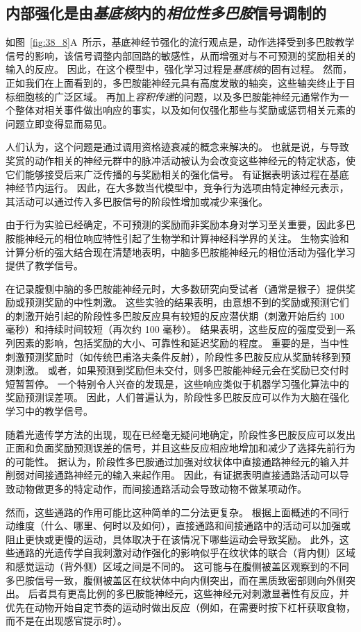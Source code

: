 \subsection{内部强化是由\textit{基底核}内的\textit{相位性多巴胺}信号调制的}

如图~\ref{fig:38_8}A~所示，基底神经节强化的流行观点是，动作选择受到多巴胺教学信号的影响，该信号调整内部回路的敏感性，从而增强对与不可预测的奖励相关的输入的反应。
因此，在这个模型中，强化学习过程是\textit{基底核}的固有过程。
然而，正如我们在上面看到的，多巴胺能神经元具有高度发散的轴突，这些轴突终止于目标细胞核的广泛区域。
再加上\textit{容积传递}的问题，以及多巴胺能神经元通常作为一个整体对相关事件做出响应的事实，以及如何仅强化那些与奖励或惩罚相关元素的问题立即变得显而易见。


人们认为，这个问题是通过调用资格迹衰减的概念来解决的。
也就是说，与导致奖赏的动作相关的神经元群中的脉冲活动被认为会改变这些神经元的特定状态，使它们能够接受后来广泛传播的与奖励相关的强化信号。
有证据表明该过程在基底神经节内运行。
因此，在大多数当代模型中，竞争行为选项由特定神经元表示，其活动可以通过传入多巴胺信号的阶段性增加或减少来强化。


由于行为实验已经确定，不可预测的奖励而非奖励本身对学习至关重要，因此多巴胺能神经元的相位响应特性引起了生物学和计算神经科学界的关注。
生物实验和计算分析的强大结合现在清楚地表明，中脑多巴胺能神经元的相位活动为强化学习提供了教学信号。


在记录腹侧中脑的多巴胺能神经元时，大多数研究向受试者（通常是猴子）提供奖励或预测奖励的中性刺激。
这些实验的结果表明，由意想不到的奖励或预测它们的刺激开始引起的阶段性多巴胺反应具有较短的反应潜伏期（刺激开始后约 100 毫秒）和持续时间较短（再次约 100 毫秒）。
结果表明，这些反应的强度受到一系列因素的影响，包括奖励的大小、可靠性和延迟奖励的程度。
重要的是，当中性刺激预测奖励时（如传统巴甫洛夫条件反射），阶段性多巴胺反应从奖励转移到预测刺激。
或者，如果预测到奖励但未交付，则多巴胺能神经元会在奖励已交付时短暂暂停。
一个特别令人兴奋的发现是，这些响应类似于机器学习强化算法中的奖励预测误差项。
因此，人们普遍认为，阶段性多巴胺反应可以作为大脑在强化学习中的教学信号。


随着光遗传学方法的出现，现在已经毫无疑问地确定，阶段性多巴胺反应可以发出正面和负面奖励预测误差的信号，并且这些反应相应地增加和减少了选择先前行为的可能性。
据认为，阶段性多巴胺通过加强对纹状体中直接通路神经元的输入并削弱对间接通路神经元的输入来起作用。
因此，有证据表明直接通路活动可以导致动物做更多的特定动作，而间接通路活动会导致动物不做某项动作。


然而，这些通路的作用可能比这种简单的二分法更复杂。
根据上面概述的不同行动维度（什么、哪里、何时以及如何），直接通路和间接通路中的活动可以加强或阻止更快或更慢的运动，具体取决于在该情况下哪些运动会导致奖励。
此外，这些通路的光遗传学自我刺激对动作强化的影响似乎在纹状体的联合（背内侧）区域和感觉运动（背外侧）区域之间是不同的。
这可能与在腹侧被盖区观察到的不同多巴胺信号一致，腹侧被盖区在纹状体中向内侧突出，而在黑质致密部则向外侧突出。
后者具有更高比例的多巴胺能神经元，这些神经元对刺激显著性有反应，并优先在动物开始自定节奏的运动时做出反应（例如，在需要时按下杠杆获取食物，而不是在出现感官提示时）。



